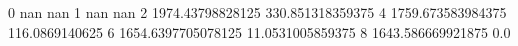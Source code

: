 0 nan nan
1 nan nan
2 1974.43798828125 330.851318359375
4 1759.673583984375 116.0869140625
6 1654.6397705078125 11.0531005859375
8 1643.586669921875 0.0
